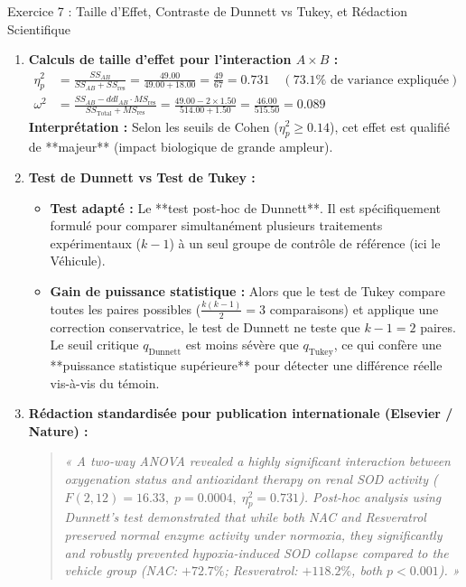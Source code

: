 \documentclass[11pt,a4paper]{article}
\begin{document}
\begin{solutionbox}{Exercice 7 : Taille d'Effet, Contraste de Dunnett vs Tukey, et Rédaction Scientifique}
\begin{enumerate}[label=\textbf{\alph*.}]
  \item \textbf{Calculs de taille d'effet pour l'interaction $A \times B$ :}
  \begin{align*}
    \eta_p^2 &= \frac{SS_{AB}}{SS_{AB} + SS_{\text{res}}} = \frac{49.00}{49.00 + 18.00} = \frac{49}{67} = \mathbf{0.731} \quad (73.1\%\text{ de variance expliquée}) \\
    \omega^2 &= \frac{SS_{AB} - ddl_{AB} \cdot MS_{\text{res}}}{SS_{\text{Total}} + MS_{\text{res}}} = \frac{49.00 - 2 \times 1.50}{514.00 + 1.50} = \frac{46.00}{515.50} = \mathbf{0.089}
  \end{align*}
  \textbf{Interprétation :} Selon les seuils de Cohen ($\eta_p^2 \ge 0.14$), cet effet est qualifié de **majeur** (impact biologique de grande ampleur).

  \item \textbf{Test de Dunnett vs Test de Tukey :}
  \begin{itemize}
    \item \textbf{Test adapté :} Le **test post-hoc de Dunnett**. Il est spécifiquement formulé pour comparer simultanément plusieurs traitements expérimentaux ($k-1$) à un seul groupe de contrôle de référence (ici le Véhicule).
    \item \textbf{Gain de puissance statistique :} Alors que le test de Tukey compare toutes les paires possibles ($\frac{k(k-1)}{2} = 3$ comparaisons) et applique une correction conservatrice, le test de Dunnett ne teste que $k-1 = 2$ paires. Le seuil critique $q_{\text{Dunnett}}$ est moins sévère que $q_{\text{Tukey}}$, ce qui confère une **puissance statistique supérieure** pour détecter une différence réelle vis-à-vis du témoin.
  \end{itemize}

  \item \textbf{Rédaction standardisée pour publication internationale (Elsevier / Nature) :}
  \begin{quote}
    \textit{« A two-way ANOVA revealed a highly significant interaction between oxygenation status and antioxidant therapy on renal SOD activity ($F(2, 12) = 16.33, \; p = 0.0004, \; \eta_p^2 = 0.731$). Post-hoc analysis using Dunnett's test demonstrated that while both NAC and Resveratrol preserved normal enzyme activity under normoxia, they significantly and robustly prevented hypoxia-induced SOD collapse compared to the vehicle group (NAC: $+72.7\%$; Resveratrol: $+118.2\%$, both $p < 0.001$). »}
  \end{quote}
\end{enumerate}
\end{solutionbox}
\end{document}
